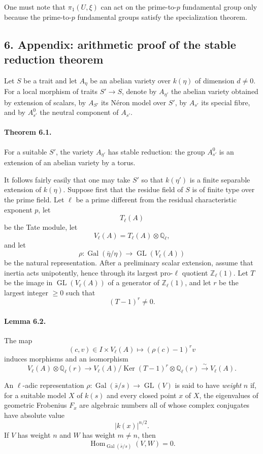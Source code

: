 \documentclass[12pt]{article}
\newcommand{\ZZ}{\mathbb Z}
\newcommand{\QQ}{\mathbb Q}
\newcommand{\Gal}{\operatorname{Gal}}
\newcommand{\GL}{\operatorname{GL}}
\newcommand{\Hom}{\operatorname{Hom}}
\newcommand{\Ker}{\operatorname{Ker}}
\newcommand{\longto}{\longrightarrow}
\begin{document}
One must note that $\pi_1(U,\xi)$ can act on the prime-to-$p$ fundamental group only because the prime-to-$p$ fundamental groups satisfy the specialization theorem.

\subsection*{6. Appendix: arithmetic proof of the stable reduction theorem}

Let $S$ be a trait and let $A_\eta$ be an abelian variety over $k(\eta)$ of dimension $d\neq0$. For a local morphism of traits $S'\to S$, denote by $A_{\eta'}$ the abelian variety obtained by extension of scalars, by $A_{S'}$ its Néron model over $S'$, by $A_{s'}$ its special fibre, and by $A^0_{s'}$ the neutral component of $A_{s'}$.

\paragraph{Theorem 6.1.}
For a suitable $S'$, the variety $A_{\eta'}$ has stable reduction: the group $A^0_{s'}$ is an extension of an abelian variety by a torus.

It follows fairly easily that one may take $S'$ so that $k(\eta')$ is a finite separable extension of $k(\eta)$. Suppose first that the residue field of $S$ is of finite type over the prime field. Let $\ell$ be a prime different from the residual characteristic exponent $p$, let
\[
T_\ell(A)
\]
be the Tate module, let
\[
V_\ell(A)=T_\ell(A)\otimes\QQ_\ell,
\]
and let
\[
\rho:\Gal(\bar\eta/\eta)\to\GL(V_\ell(A))
\]
be the natural representation. After a preliminary scalar extension, assume that inertia acts unipotently, hence through its largest pro-$\ell$ quotient $\ZZ_\ell(1)$. Let $T$ be the image in $\GL(V_\ell(A))$ of a generator of $\ZZ_\ell(1)$, and let $r$ be the largest integer $\geq0$ such that
\[
(T-1)^r\neq0.
\]

\paragraph{Lemma 6.2.}
The map
\[
(c,v)\in I\times V_\ell(A)\longmapsto (\rho(c)-1)^r v
\]
induces morphisms and an isomorphism
\[
V_\ell(A)\otimes\QQ_\ell(r)
\longto
V_\ell(A)/\Ker(T-1)^r\otimes\QQ_\ell(r)
\overset{\sim}{\longto}
V_\ell(A).
\tag{6.2.1}
\]

An $\ell$-adic representation $\rho:\Gal(\bar s/s)\to\GL(V)$ is said to have \emph{weight} $n$ if, for a suitable model $X$ of $k(s)$ and every closed point $x$ of $X$, the eigenvalues of geometric Frobenius $F_x$ are algebraic numbers all of whose complex conjugates have absolute value
\[
|k(x)|^{n/2}.
\]
If $V$ has weight $n$ and $W$ has weight $m\neq n$, then
\[
\Hom_{\Gal(\bar s/s)}(V,W)=0.
\]
\end{document}
